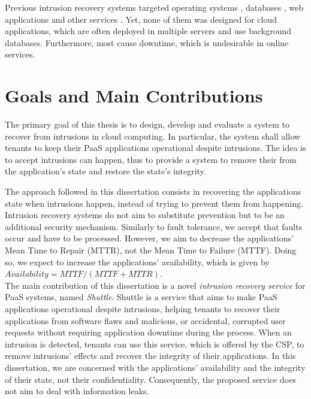 Previous intrusion recovery systems targeted operating systems \cite{taser,retro}, databases \cite{itdb,phoenix}, web applications \cite{goel,warp,aire} and other services \cite{undoForOperators}. Yet, none of them was designed for cloud applications, which are often deployed in multiple servers and use background databases. Furthermore, most cause downtime, which is undesirable in online services.
 
\section{Goals and Main Contributions}\label{sec:introduction:goals}
The primary goal of this thesis is to design, develop and evaluate a system to recover from intrusions in cloud computing. In particular, the system shall allow tenants to keep their \acf{PaaS} applications operational despite intrusions. The idea is to accept intrusions can happen, thus to provide a system to remove their from the application's state and restore the state's integrity. 

The approach followed in this dissertation consists in recovering the applications state when intrusions happen, instead of trying to prevent them from happening. Intrusion recovery systems do not aim to substitute prevention but to be an additional security mechanism. Similarly to fault tolerance, we accept that faults occur and have to be processed. However, we aim to decrease the applications' Mean Time to Repair (MTTR), not the Mean Time to Failure (MTTF). Doing so, we expect to increase the applications' availability, which is given by $Availability=MTTF/(MTTF+MTTR)$. \\

The main contribution of this dissertation is a novel \emph{intrusion recovery service} for \ac{PaaS} systems, named \emph{Shuttle}. Shuttle is a service that aims to make \ac{PaaS} applications operational despite intrusions, helping tenants to recover their applications from software flaws and malicious, or accidental, corrupted user requests without requiring application downtime during the process. When an intrusion is detected, tenants can use this service, which is offered by the \ac{CSP}, to remove intrusions' effects and recover the integrity of their applications. In this dissertation, we are concerned with the applications' availability and the integrity of their state, not their confidentiality. Consequently, the proposed service does not aim to deal with information leaks.



